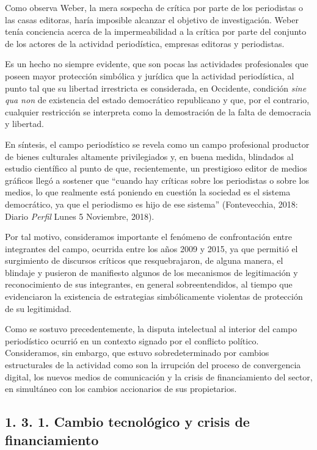 Como observa Weber, la mera sospecha de crítica por parte de los periodistas o las casas editoras, haría imposible alcanzar el objetivo de investigación. Weber tenía conciencia acerca de la impermeabilidad a la crítica por parte del conjunto de los actores de la actividad periodística, empresas editoras y periodistas.

Es un hecho no siempre evidente, que son pocas las actividades profesionales que poseen mayor protección simbólica y jurídica que la actividad periodística, al punto tal que su libertad irrestricta es considerada, en Occidente, condición \emph{sine qua non} de existencia del estado democrático republicano y que, por el contrario, cualquier restricción se interpreta como la demostración de la falta de democracia y libertad.

En síntesis, el campo periodístico se revela como un campo profesional productor de bienes culturales altamente privilegiados y, en buena medida, blindados al estudio científico al punto de que, recientemente, un prestigioso editor de medios gráficos llegó a sostener que \enquote{cuando hay críticas sobre los periodistas o sobre los medios, lo que realmente está poniendo en cuestión la sociedad es el sistema democrático, ya que el periodismo es hijo de ese sistema} (Fontevecchia, 2018: Diario \emph{Perfil} Lunes 5 Noviembre, 2018).

Por tal motivo, consideramos importante el fenómeno de confrontación entre integrantes del campo, ocurrida entre los años 2009 y 2015, ya que permitió el surgimiento de discursos críticos que resquebrajaron, de alguna manera, el blindaje y pusieron de manifiesto algunos de los mecanismos de legitimación y reconocimiento de sus integrantes, en general sobreentendidos, al tiempo que evidenciaron la existencia de estrategias simbólicamente violentas de protección de su legitimidad.

Como se sostuvo precedentemente, la disputa intelectual al interior del campo periodístico ocurrió en un contexto signado por el conflicto político. Consideramos, sin embargo, que estuvo sobredeterminado por cambios estructurales de la actividad como son la irrupción del proceso de convergencia digital, los nuevos medios de comunicación y la crisis de financiamiento del sector, en simultáneo con los cambios accionarios de sus propietarios.

\subsection{1. 3. 1. Cambio tecnológico y crisis de financiamiento}

